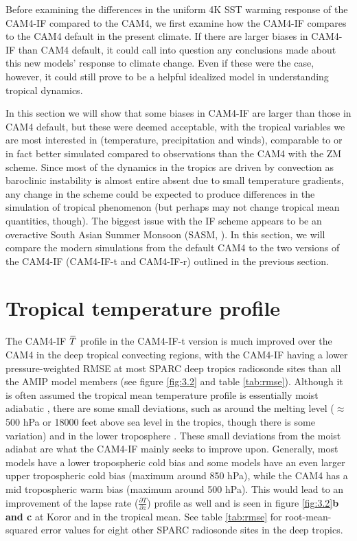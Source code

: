 \documentclass[letterpaper,12pt,titlepage,oneside,final]{book}
\newcommand{\overbar}[1]{\mkern 1.5mu\overline{\mkern-1.5mu#1\mkern-1.5mu}\mkern 1.5mu}
\begin{document}
Before examining the differences in the uniform 4K SST warming response of the CAM4-IF compared to the CAM4, we first examine how the CAM4-IF compares to the CAM4 default in the present climate. If there are larger biases in CAM4-IF than CAM4 default, it could call into question any conclusions made about this new models' response to climate change. Even if these were the case, however, it could still prove to be a helpful idealized model in understanding tropical dynamics. 

In this section we will show that some biases in CAM4-IF are larger than those in CAM4 default, but these were deemed acceptable, with the tropical variables we are most interested in (temperature, precipitation and winds), comparable to or in fact better simulated compared to observations than the CAM4 with the ZM scheme. Since most of the dynamics in the tropics are driven by convection as baroclinic instability is almost entire absent due to small temperature gradients, any change in the scheme could be expected to produce differences in the simulation of tropical phenomenon (but perhaps may not change tropical mean quantities, though). The biggest issue with the IF scheme appears to be an overactive South Asian Summer Monsoon (SASM, \cite{fan_future_2012}). In this section, we will compare the modern simulations from the default CAM4 to the two versions of the CAM4-IF (CAM4-IF-t and CAM4-IF-r) outlined in the previous section.

\section{Tropical temperature profile}

The CAM4-IF $\overbar{T}$ profile in the CAM4-IF-t version is much improved over the CAM4 in the deep tropical convecting regions, with the CAM4-IF having a lower pressure-weighted RMSE at most SPARC deep tropics radiosonde sites than all the AMIP model members (see figure \ref{fig:3.2} and table \ref{tab:rmse}). Although it is often assumed the tropical mean temperature profile is essentially moist adiabatic \citep{emanuel_quasi-equilibrium_2007}, there are some small deviations, such as around the melting level ($\approx$ 500 hPa or 18000 feet above sea level in the tropics, though there is some variation) and in the lower troposphere \citep{folkins_melting_2013}. These small deviations from the moist adiabat are what the CAM4-IF mainly seeks to improve upon. Generally, most models have a lower tropospheric cold bias and some models have an even larger upper tropospheric cold bias (maximum around 850 hPa), while the CAM4 has a mid tropospheric warm bias (maximum around 500 hPa). This would lead to an improvement of the lapse rate ($\frac{\partial{T}}{\partial{z}}$) profile as well and is seen in figure \ref{fig:3.2}\textbf{b and c} at Koror and in the tropical mean. See table \ref{tab:rmse} for root-mean-squared error values for eight other SPARC radiosonde sites in the deep tropics.
\end{document}
